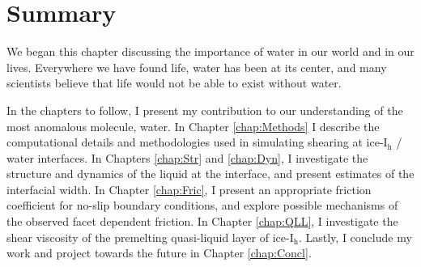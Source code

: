 


\section{Summary}
We began this chapter discussing the importance of water in our world
and in our lives. Everywhere we have found life, water has been at its
center, and many scientists believe that life would not be able to
exist without water. 

In the chapters to follow, I present my contribution to our
understanding of the most anomalous molecule, water. In Chapter
\ref{chap:Methods} I describe the computational details and
methodologies used in simulating shearing at ice-I$_\mathrm{h}$ /
water interfaces. In Chapters \ref{chap:Str} and \ref{chap:Dyn}, I
investigate the structure and dynamics of the liquid at the interface,
and present estimates of the interfacial width. In Chapter
\ref{chap:Fric}, I present an appropriate friction coefficient for
no-slip boundary conditions, and explore possible mechanisms of the
observed facet dependent friction. In Chapter \ref{chap:QLL}, I
investigate the shear viscosity of the premelting quasi-liquid layer
of ice-I$_\mathrm{h}$. Lastly, I conclude my work and project towards
the future in Chapter \ref{chap:Concl}.



